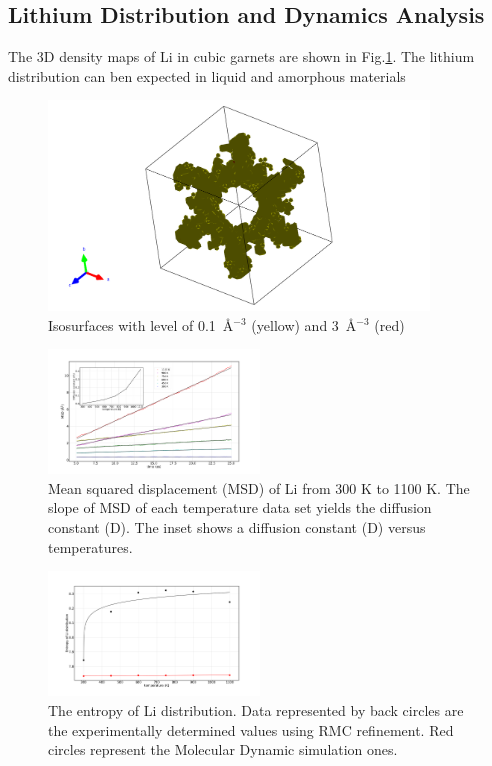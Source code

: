 \documentclass[twoside,twocolumn,9pt]{article}
\begin{document}
\subsection{Lithium Distribution and Dynamics Analysis}



The 3D density maps of Li in cubic garnets are shown in Fig.\ref{fig:pdfs}.
The lithium distribution can ben expected in liquid and amorphous materials

\begin{figure}
\centering
\includegraphics[width=0.9\textwidth]{Pics/pdfs.pdf}
\caption{Isosurfaces with level of 0.1~\AA$^{-3}$ (yellow) and 3~\AA$^{-3}$ (red)}
\label{fig:pdfs}
\end{figure}

\begin{figure}
\centering
\includegraphics[width=0.5\textwidth]{Pics/MSD.pdf}
\caption{Mean squared displacement (MSD) of Li from 300 K to 1100 K.
The slope of MSD of each temperature data set yields the diffusion constant (D).
The inset shows a diffusion constant (D) versus temperatures.}
\label{fig:msd}
\end{figure}


\begin{figure}
\centering
\includegraphics[width=0.5\textwidth]{Pics/entropy.pdf}
\caption{The entropy of Li distribution. Data represented by back circles are the experimentally determined values using RMC refinement.
Red circles represent the Molecular Dynamic simulation ones.}
\label{fig:entropy}
\end{figure}
\end{document}
